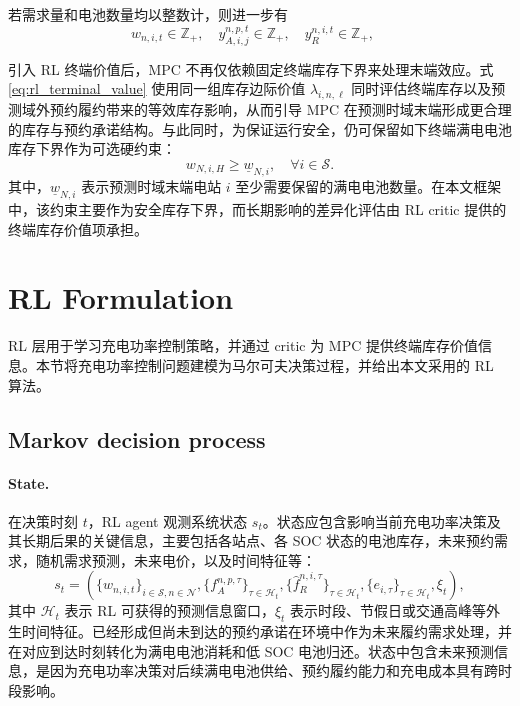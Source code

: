 \documentclass[12pt,hyperref,a4paper,UTF8]{ctexart}
\begin{document}
若需求量和电池数量均以整数计，则进一步有
\begin{equation}
w_{n,i,t}\in \mathbb{Z}_{+},\quad
 y_{A,i,j}^{n,p,t}\in \mathbb{Z}_{+},\quad
 y_R^{n,i,t}\in \mathbb{Z}_{+},\quad
\label{eq:integer}
\end{equation}

引入 RL 终端价值后，MPC 不再仅依赖固定终端库存下界来处理末端效应。式\eqref{eq:rl_terminal_value} 使用同一组库存边际价值 $\lambda_{i,n,\ell}$ 同时评估终端库存以及预测域外预约履约带来的等效库存影响，从而引导 MPC 在预测时域末端形成更合理的库存与预约承诺结构。与此同时，为保证运行安全，仍可保留如下终端满电电池库存下界作为可选硬约束：
\begin{equation}
w_{N,i,H}\ge \underline{w}_{N,i},
\quad \forall i\in \mathcal{S}.
\label{eq:terminal_inventory}
\end{equation}
其中，$\underline{w}_{N,i}$ 表示预测时域末端电站 $i$ 至少需要保留的满电电池数量。在本文框架中，该约束主要作为安全库存下界，而长期影响的差异化评估由 RL critic 提供的终端库存价值项承担。

\section{RL Formulation}

RL 层用于学习充电功率控制策略，并通过 critic 为 MPC 提供终端库存价值信息。本节将充电功率控制问题建模为马尔可夫决策过程，并给出本文采用的 RL 算法。

\subsection{Markov decision process}

\paragraph{State.}
在决策时刻 $t$，RL agent 观测系统状态 $s_t$。状态应包含影响当前充电功率决策及其长期后果的关键信息，主要包括各站点、各 SOC 状态的电池库存，未来预约需求，随机需求预测，未来电价，以及时间特征等：
\begin{equation}
s_t=
\left(
\{w_{n,i,t}\}_{i\in\mathcal{S},n\in\mathcal{N}},
\{f_A^{n,p,\tau}\}_{\tau\in\mathcal{H}_t},
\{\hat{f}_R^{n,i,\tau}\}_{\tau\in\mathcal{H}_t},
\{e_{i,\tau}\}_{\tau\in\mathcal{H}_t},
\xi_t
\right),
\label{eq:rl_state}
\end{equation}
其中 $\mathcal{H}_t$ 表示 RL 可获得的预测信息窗口，$\xi_t$ 表示时段、节假日或交通高峰等外生时间特征。已经形成但尚未到达的预约承诺在环境中作为未来履约需求处理，并在对应到达时刻转化为满电电池消耗和低 SOC 电池归还。状态中包含未来预测信息，是因为充电功率决策对后续满电电池供给、预约履约能力和充电成本具有跨时段影响。
\end{document}
